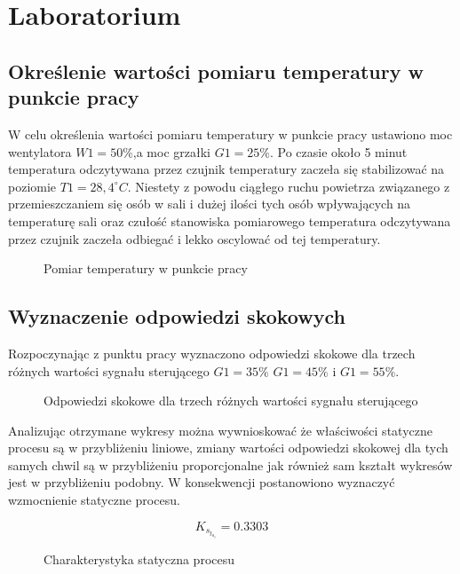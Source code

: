 \chapter{Laboratorium}

\section{Określenie wartości pomiaru temperatury w punkcie pracy}

W celu określenia wartości pomiaru temperatury w punkcie pracy ustawiono moc wentylatora  $W1 = 50\%$,a moc grzałki $G1 = 25\%$.
Po czasie około 5 minut temperatura odczytywana przez czujnik temperatury zaczeła się stabilizować  na poziomie  $T1 = 28,4^{\circ} C$. 
Niestety z powodu ciągłego ruchu powietrza związanego z przemieszczaniem się osób w sali i dużej ilości tych osób wpływających na temperaturę sali oraz czułość stanowiska pomiarowego temperatura odczytywana przez czujnik zaczeła odbiegać i lekko oscylować od tej temperatury.

\begin{figure}[H]
\centering

\caption{Pomiar temperatury w punkcie pracy}
\end{figure}

\section{Wyznaczenie odpowiedzi skokowych}

Rozpoczynając z punktu pracy wyznaczono odpowiedzi skokowe dla trzech różnych wartości sygnału sterującego  $G1 = 35\%$  $G1 = 45\%$ i $G1 = 55\%$.

\begin{figure}[H]
\centering

\caption{Odpowiedzi skokowe dla trzech różnych wartości sygnału sterującego}
\end{figure}

Analizując otrzymane wykresy można wywnioskować że właściwości statyczne procesu są w przybliżeniu liniowe, zmiany wartości odpowiedzi skokowej dla tych samych chwil są w przybliżeniu proporcjonalne jak również sam kształt wykresów jest w przybliżeniu podobny. W konsekwencji postanowiono wyznaczyć wzmocnienie statyczne procesu.

\begin{equation}
K_s_t_a_t = 0.3303
\end{equation}


\begin{figure}[H]
\centering

\caption{Charakterystyka statyczna procesu}
\end{figure}


